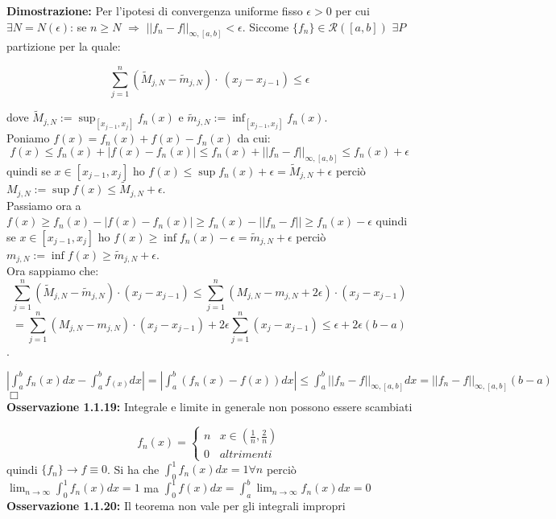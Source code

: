 \documentclass[a4paper,11pt,titlepage]{book}
\begin{document}
\textbf{Dimostrazione:} Per l'ipotesi di convergenza uniforme fisso $\epsilon >0$ per cui $\exists{N}=N(\epsilon)$: se $n\geq{N}$ $\Rightarrow$ $||f_{n}-f||_{\infty,[a,b]}<\epsilon$. Siccome $\{f_{n}\}\in\mathcal{R}([a,b])$ $\exists P$ partizione per la quale:


 $$\sum_{j=1}^n (\widetilde{M}_{j,N}-\widetilde{m}_{j,N})\cdot\ (x_{j}-x_{j-1})\leq\epsilon$$

 dove $\widetilde{M}_{j,N}:=\sup_{[x_{j-1},x_{j}]}f_{n}(x)$ e $\widetilde{m}_{j,N}:=\inf_{[x_{j-1},x_{j}]}f_{n}(x)$. \\
 
 Poniamo $f(x)=f_{n}(x)+f(x)-f_{n}(x)$ da cui: $$f(x)\leq f_{n}(x)+|f(x)-f_{n}(x)|\leq f_{n}(x)+||f_{n}-f||_{\infty,[a,b]}\leq f_{n}(x)+\epsilon$$ quindi se $x\in [x_{j-1},x_{j}] $ ho $f(x) \leq \sup f_{n}(x)+\epsilon=\widetilde{M}_{j,N}+\epsilon$ perciò $M_{j,N}:=\sup f(x)\leq\widetilde{M}_{j,N}+\epsilon$.\\

Passiamo ora a $f(x)\geq f_{n}(x)-|f(x)-f_{n}(x)|\geq f_{n}(x)-||f_{n}-f|| \geq f_{n}(x)-\epsilon$ quindi se $x\in [x_{j-1},x_{j}] $ ho $f(x) \geq \inf f_{n}(x)-\epsilon=\widetilde{m}_{j,N}+\epsilon$ perciò $m_{j,N}:=\inf f(x)\geq\widetilde{m}_{j,N}+\epsilon$. \\

Ora sappiamo che:
 $$\sum_{j=1}^n (\widetilde{M}_{j,N}-\widetilde{m}_{j,N}) \cdot (x_{j}-x_{j-1})\leq \sum_{j=1}^n (M_{j,N}-m_{j,N}+2\epsilon)\cdot (x_{j}-x_{j-1})$$  $$=\sum_{j=1}^n (M_{j,N}-m_{j,N})\cdot (x_{j}-x_{j-1})+2\epsilon\sum_{j=1}^n(x_{j}-x_{j-1})\leq \epsilon +2\epsilon(b-a)$$.

$|\int_{a}^{b}f_{n}(x)dx-\int_{a}^{b}f_(x)dx|=|\int_{a}^{b}(f_{n}(x)-f(x))dx|\leq\int_{a}^{b}||f_{n}-f||_{\infty,[a,b]}dx=||f_{n}-f||_{\infty,[a,b]}(b-a)$ $\Box$\\

\textbf{Osservazione 1.1.19:} Integrale e limite in generale non possono essere scambiati

$$f_{n}(x)=\begin{cases} n &  x\in (\frac{1}{n},\frac{2}{n}) \\ 0 & altrimenti \end{cases}$$ quindi $\{f_{n}\}\rightarrow f\equiv 0$. Si ha che $\int_{0}^{1}f_{n}(x)dx=1 \forall{n}$ perciò $ \lim_{n \to \infty}\int_{0}^{1}f_{n}(x)dx=1$ ma $\int_{0}^{1}f(x)dx=\int_{a}^{b}\lim_{n \to \infty}{f_{n}(x)}dx=0$ \\

\textbf{Osservazione 1.1.20:} Il teorema non vale per gli integrali impropri
\end{document}
